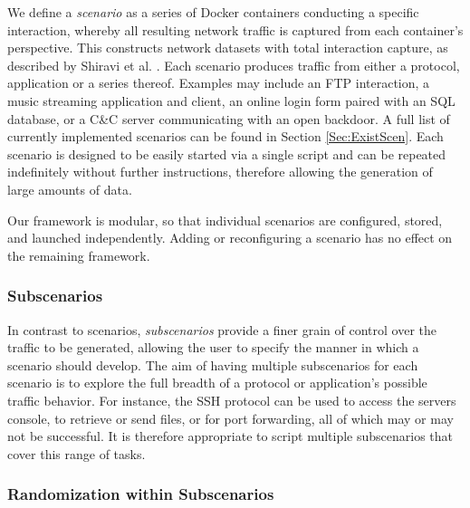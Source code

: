 \documentclass{article}
\begin{document}
We define a \emph{scenario} as a series of Docker containers conducting a specific interaction, whereby all resulting network traffic is captured from each container's perspective. This constructs network datasets with total interaction capture, as described by Shiravi et al. \cite{shiravi2012toward}. Each scenario produces traffic from either a protocol, application or a series thereof. %
Examples may include an FTP interaction, a music streaming application and client, an online login form paired with an SQL database, or a C\&C server communicating with an open backdoor. A full list of currently implemented scenarios can be found in Section \ref{Sec:ExistScen}.
Each scenario is designed to be easily started via a single script and can be repeated indefinitely without further instructions, therefore allowing the generation of large amounts of data.

Our framework is modular, so that individual scenarios are configured, stored, and launched independently. Adding or reconfiguring a scenario has no effect on the remaining framework.

\subsubsection*{Subscenarios} \label{Sec:Subscenarios}

In contrast to scenarios, \textit{subscenarios} provide a finer grain of control over the traffic to be generated, allowing the user to specify the manner in which a scenario should develop. The aim of having multiple subscenarios for each scenario is to explore the full breadth of a protocol or application's possible traffic behavior. For instance, the SSH protocol can be used to access the servers console, to retrieve or send files, or for port forwarding, all of which may or may not be successful. It is therefore appropriate to script multiple subscenarios that cover this range of tasks.



\subsubsection*{Randomization within Subscenarios}\label{Sec:randomsubscen}
\end{document}
